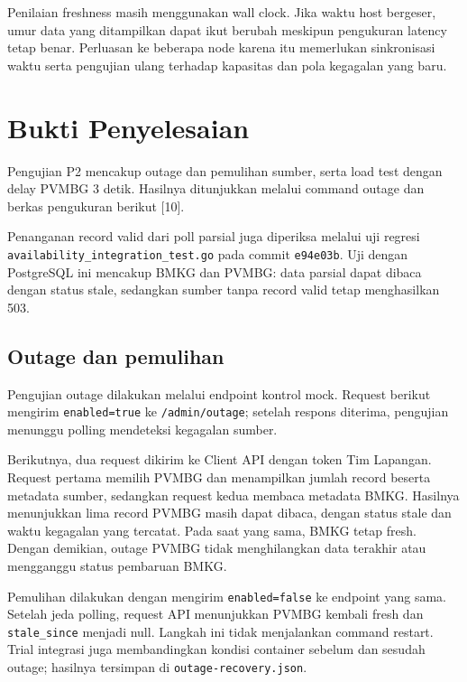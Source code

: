 Penilaian freshness masih menggunakan wall clock. Jika waktu host bergeser, umur data yang ditampilkan dapat ikut berubah meskipun pengukuran latency tetap benar. Perluasan ke beberapa node karena itu memerlukan sinkronisasi waktu serta pengujian ulang terhadap kapasitas dan pola kegagalan yang baru.

\section{Bukti Penyelesaian}
Pengujian P2 mencakup outage dan pemulihan sumber, serta load test dengan delay PVMBG 3 detik. Hasilnya ditunjukkan melalui command outage dan berkas pengukuran berikut [10].

Penanganan record valid dari poll parsial juga diperiksa melalui uji regresi \texttt{availability\_integration\_test.go} pada commit \texttt{e94e03b}. Uji dengan PostgreSQL ini mencakup BMKG dan PVMBG: data parsial dapat dibaca dengan status stale, sedangkan sumber tanpa record valid tetap menghasilkan 503.

\subsection{Outage dan pemulihan}
Pengujian outage dilakukan melalui endpoint kontrol mock. Request berikut mengirim \texttt{enabled=true} ke \texttt{/admin/outage}; setelah respons diterima, pengujian menunggu polling mendeteksi kegagalan sumber.

Berikutnya, dua request dikirim ke Client API dengan token Tim Lapangan. Request pertama memilih PVMBG dan menampilkan jumlah record beserta metadata sumber, sedangkan request kedua membaca metadata BMKG. Hasilnya menunjukkan lima record PVMBG masih dapat dibaca, dengan status stale dan waktu kegagalan yang tercatat. Pada saat yang sama, BMKG tetap fresh. Dengan demikian, outage PVMBG tidak menghilangkan data terakhir atau mengganggu status pembaruan BMKG.

Pemulihan dilakukan dengan mengirim \texttt{enabled=false} ke endpoint yang sama. Setelah jeda polling, request API menunjukkan PVMBG kembali fresh dan \texttt{stale\_since} menjadi null. Langkah ini tidak menjalankan command restart. Trial integrasi juga membandingkan kondisi container sebelum dan sesudah outage; hasilnya tersimpan di \texttt{outage-recovery.json}.

